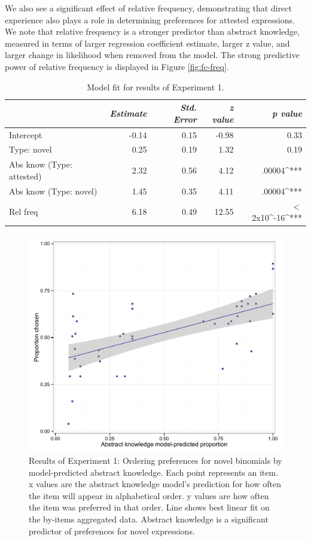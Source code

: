 \documentclass[authoryear]{elsarticle}
\begin{document}
We also see a significant effect of relative frequency, demonstrating that direct experience also plays a role in determining preferences for attested expressions. We note that relative frequency is a stronger predictor than abstract knowledge, measured in terms of larger regression coefficient estimate, larger z value, and larger change in likelihood when removed from the model. The strong predictive power of relative frequency is displayed in Figure \ref{fig:fc-freq}. 


\begin{table}[t]
\centering
\begin{tabular}{ l  r  r  r  r  }
\hline\hline
 & \emph{Estimate} &\emph{Std. Error} & \emph{z value} & \emph{p value} \\   \hline
Intercept     &       -0.14 &    0.15  & -0.98& 0.33    \\  
Type: novel       &          0.25   &  0.19 & 1.32 &0.19 \\  
Abs know  (Type: attested)    &   2.32   &  0.56  & 4.12 & .00004^{***} \\  
Abs know (Type: novel)   &1.45 &    0.35  & 4.11 &.00004^{***}    \\  
Rel freq    &      6.18   &  0.49 & 12.55 & $<$2x10^{-16}^{***}\\\hline  
\end{tabular}
\caption{Model fit for results of Experiment 1.}\label{t:fc-all}
\end{table}


\begin{figure}[t]
\includegraphics[scale=0.7]{fc-novel.pdf}
\caption{Results of Experiment 1: Ordering preferences for novel binomials by model-predicted abstract knowledge. Each point represents an item. x values are the abstract knowledge model's prediction for how often the item will appear in alphabetical order. y values are how often the item was preferred in that order. Line shows best linear fit on the by-items aggregated data. Abstract knowledge is a significant predictor of preferences for novel expressions.} \label{fig:fc-abs}
\end{figure}
\end{document}

